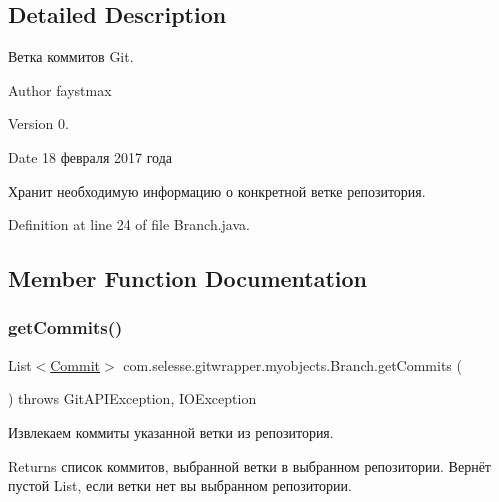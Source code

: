 \subsection{Detailed Description}
Ветка коммитов Git. 

\begin{DoxyAuthor}{Author}
faystmax 
\end{DoxyAuthor}
\begin{DoxyVersion}{Version}
0. 
\end{DoxyVersion}
\begin{DoxyDate}{Date}
18 февраля 2017 года 
\end{DoxyDate}
Хранит необходимую информацию о конкретной ветке репозитория. 

Definition at line 24 of file Branch.\+java.



\subsection{Member Function Documentation}
\mbox{\label{classcom_1_1selesse_1_1gitwrapper_1_1myobjects_1_1_branch_adaccf954960eb975eaadb039158f0cc1}} 
\subsubsection{\texorpdfstring{get\+Commits()}{getCommits()}}
{\footnotesize\ttfamily List$<$\hyperlink{classcom_1_1selesse_1_1gitwrapper_1_1myobjects_1_1_commit}{Commit}$>$ com.\+selesse.\+gitwrapper.\+myobjects.\+Branch.\+get\+Commits (\begin{DoxyParamCaption}{ }\end{DoxyParamCaption}) throws Git\+A\+P\+I\+Exception, I\+O\+Exception}

Извлекаем коммиты указанной ветки из репозитория.

\begin{DoxyReturn}{Returns}
список коммитов, выбранной ветки в выбранном репозитории. Вернёт пустой List, если ветки нет вы выбранном репозитории. 
\end{DoxyReturn}


